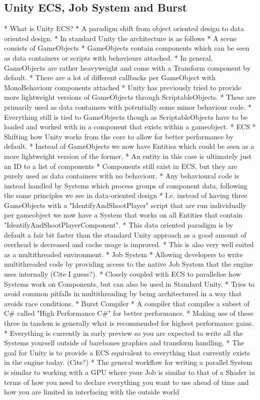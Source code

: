 \subsection{Unity ECS, Job System and Burst}
  * What is Unity ECS?	
	* A paradigm shift from object oriented design to data oriented design.
	* In standard Unity the architecture is as follows
		* A scene consists of GameObjects
		* GameObjects contain components which can be seen as data containers or scripts with behaviours attached.
	* In general, GameObjects are rather heavyweight and come with a Transform component by default.
		* There are a lot of different callbacks per GameObject with MonoBehaviour components attached
	* Unity has previously tried to provide more lightweight versions of GameObjects through ScriptableObjects.
		* These are primarily used as data containers with potentially some minor behaviour code.
        * Everything still is tied to GameObjects though as ScriptableObjects have to be loaded and worked with in a component that exists within a gameobject. 
    * ECS
    	* Shifting how Unity works from the core to allow for better performance by default.
    	* Instead of GameObjects we now have Entities which could be seen as a more lightweight version of the former. 
    	   * An entity in this case is ultimately just an ID to a list of components
    	* Components still exist in ECS, but they are purely used as data containers with no behaviour.
    	* Any behavioural code is instead handled by Systems which process groups of component data, following the same principles we see in data-oriented design
    		* I.e. instead of having three GameObjects with a "IdentifyAndShootPlayer" script that are run individually per gameobject we now have a System that works on all Entities that contain "IdentifyAndShootPlayerComponent".
    	* This data oriented paradigm is by default a fair bit faster than the standard Unity approach as a good amount of overhead is decreased and cache usage is improved.
        * This is also very well suited as a multithreaded environment.
    * Job System
      * Allowing developers to write multithreaded code by providing access to the native Job System that the engine uses internally (Cite I guess?).
	  * Closely coupled with ECS to parallelise how Systems work on Components, but can also be used in Standard Unity. 
      * Tries to avoid common pitfalls in multithreading by being architectured in a way that avoids race conditions.
    * Burst Compiler
      * A compiler that compiles a subset of C\# called "High Performance C\#" for better performance. 
    * Making use of these three in tandem is generally what is recommended for highest performance gains. 
    * Everything is currently in early preview so you are expected to write all the Systems yourself outside of barebones graphics and transform handling. 
	* The goal for Unity is to provide a ECS equivalent to everything that currently exists in the engine today. (Cite?) 
	* The general workflow for writing a parallel System is similar to working with a GPU where your Job is similar to that of a Shader in terms of how you need to declare everything you want to use ahead of time and how you are limited in interfacing with the outside world

